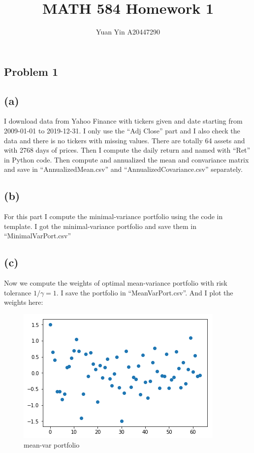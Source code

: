 \documentclass[letterpaper,11pt]{article}
\author{Yuan Yin A20447290}
\title{MATH 584 Homework 1}
\begin{document}
\large
\maketitle
\begin{spacing}{1.2}  %
\section*{Problem 1}
\subsection*{(a)}
I download data from Yahoo Finance with tickers given and date starting from 2009-01-01 to 2019-12-31. I only use the ``Adj Close'' part and I also check the data and there is no tickers with missing values. There are totally 64 assets and with 2768 days of prices. Then I compute the daily return and named with ``Ret'' in Python code. Then compute and annualized the mean and convariance matrix and save in ``AnnualizedMean.csv'' and ``AnnualizedCovariance.csv'' separately.

\subsection*{(b)}
For this part I compute the minimal-variance portfolio using the code in template. I got the minimal-variance portfolio and save them in ``MinimalVarPort.csv''

\subsection*{(c)}
Now we compute the weights of optimal mean-variance portfolio with risk tolerance $1/\gamma = 1$. I save the portfolio in ``MeanVarPort.csv''. And I plot the weights here:

\begin{figure}[h] %
\centering
\includegraphics[scale=0.5]{1(c).png}
\caption{mean-var portfolio}
\label{fig:label}
\end{figure}


\end{spacing}
\end{document}
